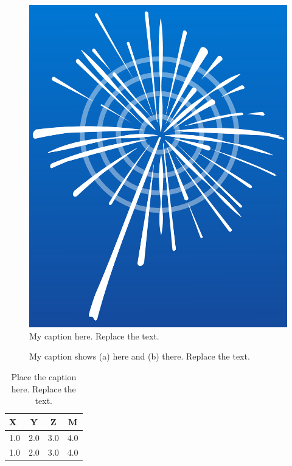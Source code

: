 \documentclass[10pt, paper=a4, UKenglish]{article}
\begin{document}
\begin{figure}[!htb]
  \centering
  \includegraphics[width=0.25\linewidth]{picture}
  \caption{My caption here. Replace the text.}
  \label{fig:picture}
\end{figure}

\begin{figure}[!htb]
  \centering
  \qquad
  \caption{My caption shows (a) here and (b) there. Replace the text.}
  \label{fig:pictures}
\end{figure}


\begin{table}[!htb]
  \begin{center}
    \begin{tabular}{l|ccc}
      \hline
      \hline
      X &  Y & Z & M \\
      \hline
      1.0 &  2.0  &  3.0 & 4.0 \\
      1.0 &  2.0  &  3.0 & 4.0 \\
      \hline
      \hline
    \end{tabular}
    \caption{Place the caption here. Replace the text.}
    \label{tab:table1}
  \end{center}
\end{table}
\end{document}
